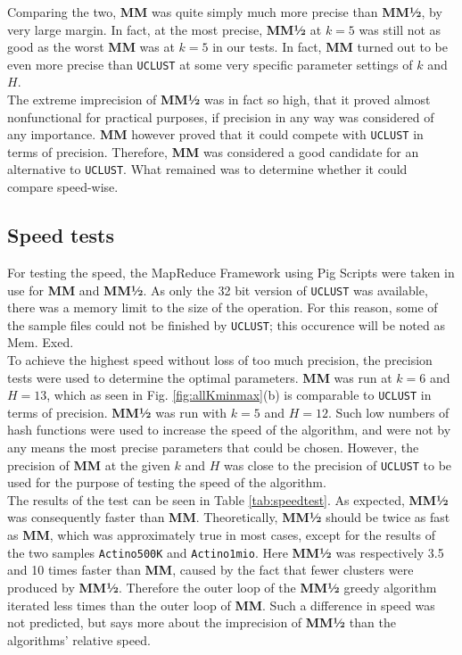 \documentclass[../../main.tex]{subfiles}
\begin{document}
Comparing the two, {\bf MM} was quite simply much more precise than {\bf MM½}, by very large margin. In fact, at the most precise, {\bf MM½} at $k=5$ was still not as good as the worst {\bf MM} was at $k=5$ in our tests. In fact, {\bf MM} turned out to be even more precise than \texttt{UCLUST} at some very specific parameter settings of $k$ and $H$.\\

The extreme imprecision of {\bf MM½} was in fact so high, that it proved almost nonfunctional for practical purposes, if precision in any way was considered of any importance. {\bf MM} however proved that it could compete with \texttt{UCLUST} in terms of precision. Therefore, {\bf MM} was considered a good candidate for an alternative to \texttt{UCLUST}. What remained was to determine whether it could compare speed-wise.

\subsection{Speed tests}

For testing the speed, the MapReduce Framework using Pig Scripts were taken in use for {\bf MM} and {\bf MM½}. As only the 32 bit version of \texttt{UCLUST} was available, there was a memory limit to the size of the operation. For this reason, some of the sample files could not be finished by \texttt{UCLUST}; this occurence will be noted as Mem. Exed.\\

To achieve the highest speed without loss of too much precision, the precision tests were used to determine the optimal parameters. {\bf MM} was run at $k=6$ and $H=13$, which as seen in Fig. \ref{fig:allKminmax}(b) is comparable to \texttt{UCLUST} in terms of precision. {\bf MM½} was run with $k=5$ and $H=12$. Such low numbers of hash functions were used to increase the speed of the algorithm, and were not by any means the most precise parameters that could be chosen. However, the precision of {\bf MM} at the given $k$ and $H$ was close to the precision of {\tt UCLUST} to be used for the purpose of testing the speed of the algorithm.\\

The results of the test can be seen in Table \ref{tab:speedtest}. As expected, {\bf MM½} was consequently faster than {\bf MM}. Theoretically, {\bf MM½} should be twice as fast as {\bf MM}, which was approximately true in most cases, except for the results of the two samples {\tt Actino500K} and {\tt Actino1mio}. Here {\bf MM½} was respectively 3.5 and 10 times faster than {\bf MM}, caused by the fact that fewer clusters were produced by {\bf MM½}. Therefore the outer loop of the {\bf MM½} greedy algorithm iterated less times than the outer loop of {\bf MM}. Such a difference in speed was not predicted, but says more about the imprecision of {\bf MM½} than the algorithms' relative speed.\\
\end{document}
